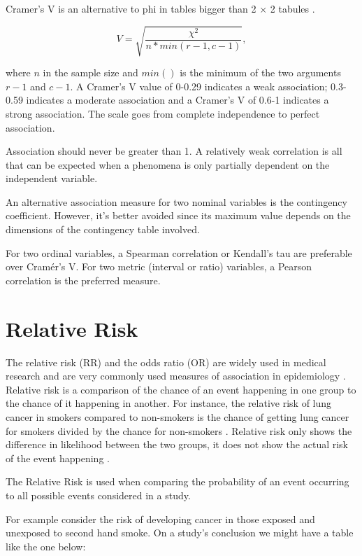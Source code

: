 \documentclass[
]{book}
\begin{document}
Cramer's V is an alternative to phi in tables bigger than 2 \(\times\) 2 tabules \citep{akoglu}.

\[V = \sqrt{\frac{\chi^2}{n*min(r-1,c-1)}},\]

where \(n\) in the sample size and \(min()\) is the minimum of the two arguments \(r-1\) and \(c-1\). A Cramer's V value of 0-0.29 indicates a weak association; 0.3-0.59 indicates a moderate association and a Cramer's V of 0.6-1 indicates a strong association. The scale goes from complete independence to perfect association.

Association should never be greater than 1. A relatively weak correlation is all that can be expected when a phenomena is only partially dependent on the independent variable.

An alternative association measure for two nominal variables is the contingency coefficient. However, it's better avoided since its maximum value depends on the dimensions of the contingency table involved.

For two ordinal variables, a Spearman correlation or Kendall's tau are preferable over Cramér's V. For two metric (interval or ratio) variables, a Pearson correlation is the preferred measure.

\hypertarget{relative-risk}{%
\section{Relative Risk}\label{relative-risk}}

The relative risk (RR) and the odds ratio (OR) are widely used in medical research and are very commonly used measures of association in epidemiology \citep{schmidtty}. Relative risk is a comparison of the chance of an event happening in one group to the chance of it happening in another. For instance, the relative risk of lung cancer in smokers compared to non-smokers is the chance of getting lung cancer for smokers divided by the chance for non-smokers \citep{tenny}. Relative risk only shows the difference in likelihood between the two groups, it does not show the actual risk of the event happening \citep{tenny}.

The Relative Risk is used when comparing the probability of an event occurring to all possible events considered in a study.

For example consider the risk of developing cancer in those exposed and unexposed to second hand smoke. On a study's conclusion we might have a table like the one below:
\end{document}
